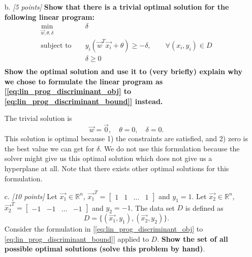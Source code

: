 \begin{enumerate}
  \item [b.] {\em [5 points]} {\bf Show that there is a
      trivial optimal solution for the following linear
      program:}
    \begin{eqnarray*}
      \min_{\vec{w},\theta,\delta} & & \delta  \\
      \textrm{subject to } & & y_i(\vec{w}^T \vec{x_i} + \theta) \geq - \delta, \qquad \forall (x_i,y_i) \in D \\
      && \delta \geq 0  \\
    \end{eqnarray*}
	{\bf Show the optimal solution and use it to (very briefly)
	explain why we chose to formulate the linear program as
	[\eqref{eq:lin_prog_discriminant_obj} to \eqref{eq:lin_prog_discriminant_bound}]
	instead.}
	
	{\color{red}
	
The trivial solution is
      \begin{equation*}
        \vec{w} = \vec{0}, \quad \theta=0, \quad \delta = 0.
      \end{equation*}
      This solution is optimal because 1) the constraints are
      satisfied, and 2) zero is the best value we can get for
      $\delta$.  We do not use this formulation because the solver
      might give us this optimal solution which does not give us a
      hyperplane at all. Note that there exists other optimal solutions for
      this formulation.
	
	}

\item [c.] {\em [10 points]} 
Let $\vec{x_1} \in \mathbb{R}^n$, $\vec{x_1}^T =
\begin{bmatrix}
  1 & 1 & \ldots & 1
\end{bmatrix}$ and $y_1 = 1$. 
Let
$\vec{x_2} \in \mathbb{R}^n$, $\vec{x_2}^T =
\begin{bmatrix}
  -1 & -1 & \ldots & -1
\end{bmatrix}$ and $y_2 = -1$.
The data set $D$ is defined as
\begin{equation*}
    D = \{ (\vec{x_1},y_1), (\vec{x_2},y_2)\}.
\end{equation*}
Consider the formulation in
[\eqref{eq:lin_prog_discriminant_obj} to \eqref{eq:lin_prog_discriminant_bound}]
applied to
$D$. {\bf Show the set of all possible optimal solutions (solve this problem by hand)}.
  
  \end{enumerate}

